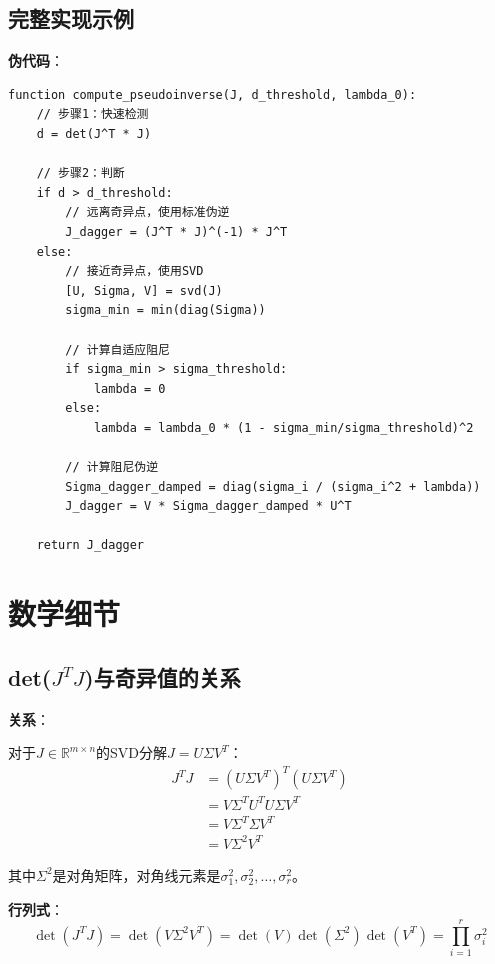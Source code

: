 \documentclass[12pt,a4paper]{article}
\begin{document}
\subsection{完整实现示例}

\textbf{伪代码}：

\begin{verbatim}
function compute_pseudoinverse(J, d_threshold, lambda_0):
    // 步骤1：快速检测
    d = det(J^T * J)
    
    // 步骤2：判断
    if d > d_threshold:
        // 远离奇异点，使用标准伪逆
        J_dagger = (J^T * J)^(-1) * J^T
    else:
        // 接近奇异点，使用SVD
        [U, Sigma, V] = svd(J)
        sigma_min = min(diag(Sigma))
        
        // 计算自适应阻尼
        if sigma_min > sigma_threshold:
            lambda = 0
        else:
            lambda = lambda_0 * (1 - sigma_min/sigma_threshold)^2
        
        // 计算阻尼伪逆
        Sigma_dagger_damped = diag(sigma_i / (sigma_i^2 + lambda))
        J_dagger = V * Sigma_dagger_damped * U^T
    
    return J_dagger
\end{verbatim}

\section{数学细节}

\subsection{det($J^T J$)与奇异值的关系}

\textbf{关系}：

对于$J \in \mathbb{R}^{m \times n}$的SVD分解$J = U\Sigma V^T$：
\begin{align}
J^T J &= (U\Sigma V^T)^T (U\Sigma V^T) \\
      &= V\Sigma^T U^T U\Sigma V^T \\
      &= V\Sigma^T\Sigma V^T \\
      &= V\Sigma^2 V^T
\end{align}

其中$\Sigma^2$是对角矩阵，对角线元素是$\sigma_1^2, \sigma_2^2, \ldots, \sigma_r^2$。

\textbf{行列式}：
\begin{equation}
\det(J^T J) = \det(V\Sigma^2 V^T) = \det(V)\det(\Sigma^2)\det(V^T) = \prod_{i=1}^r \sigma_i^2
\end{equation}
\end{document}
